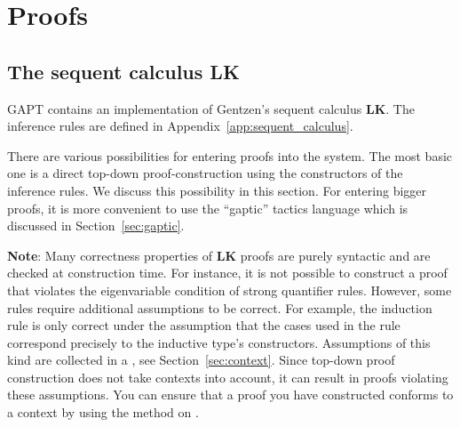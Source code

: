 \documentclass[a4paper,11pt]{book}
\newcommand{\LK}{\textbf{LK}}
\newcommand{\cli}[1]{{\ttfamily {#1}}}
\begin{document}
\section{Proofs}\label{sec:entering_proofs}

\subsection{The sequent calculus LK}
GAPT contains an implementation of Gentzen's sequent calculus {\LK}.
The inference rules are defined in Appendix~\ref{app:sequent_calculus}.

There are various possibilities for entering proofs into the system. The most
basic one is a direct top-down proof-construction using the constructors
of the inference rules. We discuss this possibility in this section. For
entering bigger proofs, it is more convenient to use the ``gaptic'' tactics
language which is discussed in Section~\ref{sec:gaptic}.

\textbf{Note}: Many correctness properties of {\LK} proofs are purely syntactic
and are checked at construction time. For instance, it is not
possible to construct a proof that violates the eigenvariable condition
of strong quantifier rules. However, some rules require additional
assumptions to be correct. For example, the induction rule is only
correct under the assumption that the cases used in the rule
correspond precisely to the inductive type's constructors. Assumptions
of this kind are collected in a \cli{Context}, see Section~\ref{sec:context}.
Since top-down proof construction does not take contexts into account,
it can result in proofs violating these assumptions. You can ensure that
a proof you have constructed conforms to a context \cli{ctx} by using the
\cli{check} method on \cli{ctx}.
\end{document}
